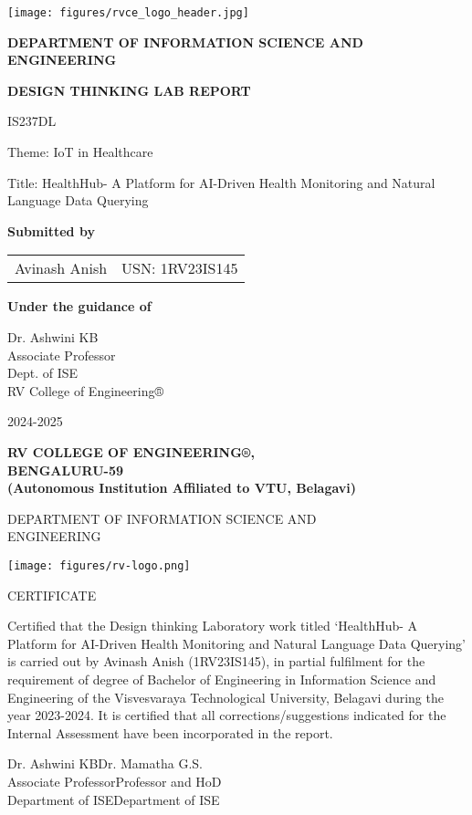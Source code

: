 \documentclass[12pt]{report}
\renewcommand{\normalsize}{\fontsize{12}{14}\selectfont}
\renewcommand{\maketitle}{
    \begin{titlepage}
        \centering
        \vspace*{-2cm}
        
        \begin{center}
            \texttt{[image: figures/rvce\_logo\_header.jpg]}\par
        \end{center}
        \vspace{0.5cm}
        
        {\Large\bfseries DEPARTMENT OF INFORMATION SCIENCE AND ENGINEERING\par}
        \vspace{0.7cm}
        
        {\Large\bfseries DESIGN THINKING LAB REPORT\par}
        \vspace{0.3cm}
        {\large IS237DL\par}
        \vspace{0.7cm}

        {\large Theme: IoT in Healthcare\par}
        \vspace{0.3cm}
        {\large Title: HealthHub- A Platform for AI-Driven Health Monitoring and Natural Language Data Querying\par}
        \vspace{1cm}
        
        {\large\bfseries Submitted by\par}
        \vspace{0.3cm}
        \begin{tabular}{ll}
            Avinash Anish & USN: 1RV23IS145 \\
        \end{tabular}
        \vspace{1cm}
        
        {\large\bfseries Under the guidance of\par}
        \vspace{0.2cm}
        Dr. Ashwini KB\\
        Associate Professor\\
        Dept. of ISE\\
        RV College of Engineering®\par
        \vfill
        
        {\large 2024-2025}
    \end{titlepage}
}
\begin{document}
\thispagestyle{empty}
\maketitle

\thispagestyle{empty}
\vspace*{-1.5cm}  %
{\centering
\large\bfseries   %
RV COLLEGE OF ENGINEERING®,\\
BENGALURU-59\\
\vspace{0.1cm}    %
{\small (Autonomous Institution Affiliated to VTU, Belagavi)}\par  %
\vspace{0.3cm}    %
DEPARTMENT OF INFORMATION SCIENCE AND\\
ENGINEERING\par
\vspace{0.7cm}    %
\texttt{[image: figures/rv-logo.png]}\par  %
\vspace{0.7cm}    %
CERTIFICATE\par
}
\vspace{0.3cm}    %

\small            %
\noindent Certified that the Design thinking Laboratory work titled `HealthHub- A Platform for AI-Driven Health Monitoring and Natural Language Data Querying' is carried out by Avinash Anish (1RV23IS145), in partial fulfilment for the requirement of degree of Bachelor of Engineering in Information Science and Engineering of the Visvesvaraya Technological University, Belagavi during the year 2023-2024. It is certified that all corrections/suggestions indicated for the Internal Assessment have been incorporated in the report.

\vspace{0.7cm}    %
\normalsize       %
\begin{flushleft}
\hspace{1cm}Dr. Ashwini KB\hfill Dr. Mamatha G.S.\hspace{1cm}\\
\hspace{1cm}Associate Professor\hfill Professor and HoD\hspace{1cm}\\
\hspace{1cm}Department of ISE\hfill Department of ISE\hspace{1cm}
\end{flushleft}
\end{document}

